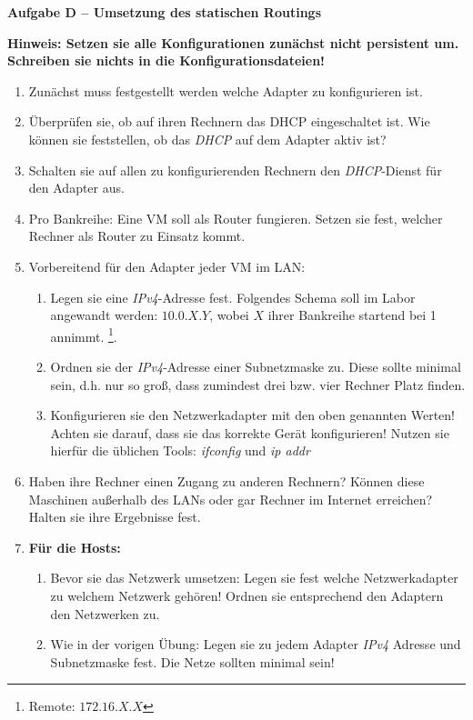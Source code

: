 \documentclass[paper=a4,fontsize=11pt]{scrartcl}%
\numberwithin{equation}{section}
\begin{document}
\begin{center}\Large{\textbf{Aufgabe D -- Umsetzung des statischen Routings}}\end{center}\vskip0.25in
\textbf{Hinweis: Setzen sie alle Konfigurationen zunächst nicht persistent um. Schreiben sie nichts in die Konfigurationsdateien!}
\begin{enumerate}
	\item Zunächst muss festgestellt werden welche Adapter zu konfigurieren ist.
	\item Überprüfen sie, ob auf ihren Rechnern das DHCP eingeschaltet ist. Wie können sie feststellen, ob das \emph{DHCP} auf dem Adapter aktiv ist?
	\item Schalten sie auf allen zu konfigurierenden Rechnern den \emph{DHCP}-Dienst für den Adapter aus.
	\item Pro Bankreihe: Eine VM soll als Router fungieren. Setzen sie fest, welcher Rechner als Router zu Einsatz kommt.
	\item Vorbereitend für den Adapter jeder VM im LAN:
	\begin{enumerate}
		\item Legen sie eine \emph{IPv4}-Adresse fest. Folgendes Schema soll im Labor angewandt werden: $10.0.X.Y$, wobei $X$ ihrer Bankreihe startend bei 1 annimmt. \footnote{Remote: $172.16.X.X$}.
		\item Ordnen sie der \emph{IPv4}-Adresse einer Subnetzmaske zu. Diese sollte minimal sein, d.h. nur so groß, dass zumindest drei bzw. vier Rechner Platz finden.
		\item Konfigurieren sie den Netzwerkadapter mit den oben genannten Werten!\\
		Achten sie darauf, dass sie das korrekte Gerät konfigurieren! Nutzen sie hierfür die üblichen Tools: \emph{ifconfig} und \emph{ip addr}
	\end{enumerate}
	\item Haben ihre Rechner einen Zugang zu anderen Rechnern? Können diese Maschinen außerhalb des LANs oder gar Rechner im Internet erreichen? Halten sie ihre Ergebnisse fest.
	\item \textbf{Für die Hosts:}
	\begin{enumerate}
		\item Bevor sie das Netzwerk umsetzen: Legen sie fest welche Netzwerkadapter zu welchem Netzwerk gehören! Ordnen sie entsprechend den Adaptern den Netzwerken zu.
		\item Wie in der vorigen Übung: Legen sie zu jedem Adapter \emph{IPv4} Adresse und Subnetzmaske fest. Die Netze sollten minimal sein!

\end{enumerate}
\end{enumerate}
\end{document}

